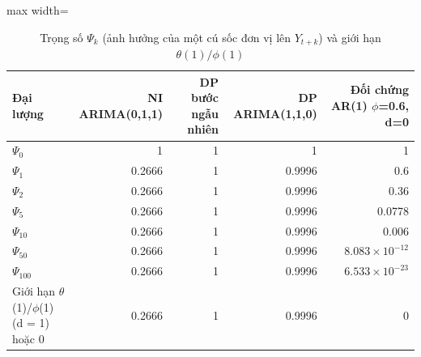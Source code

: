 \begin{table}[H]
\centering\footnotesize
\caption{Trọng số $\Psi_k$ (ảnh hưởng của một cú sốc đơn vị lên $Y_{t+k}$) và giới hạn $\theta(1)/\phi(1)$}\label{tab:tab_b12_06_psi_weights}
\begin{adjustbox}{max width=\linewidth}
\begin{tabular}{|l|r|r|r|r|}
\toprule
Đại lượng & NI ARIMA(0,1,1) & DP bước ngẫu nhiên & DP ARIMA(1,1,0) & Đối chứng AR(1) $\phi$=0.6, d=0 \\
\midrule
$\Psi_{0}$ & 1 & 1 & 1 & 1 \\
$\Psi_{1}$ & 0.2666 & 1 & 0.9996 & 0.6 \\
$\Psi_{2}$ & 0.2666 & 1 & 0.9996 & 0.36 \\
$\Psi_{5}$ & 0.2666 & 1 & 0.9996 & 0.0778 \\
$\Psi_{10}$ & 0.2666 & 1 & 0.9996 & 0.006 \\
$\Psi_{50}$ & 0.2666 & 1 & 0.9996 & $8.083\times10^{-12}$ \\
$\Psi_{100}$ & 0.2666 & 1 & 0.9996 & $6.533\times10^{-23}$ \\
Giới hạn $\theta$(1)/$\phi$(1) (d = 1) hoặc 0 & 0.2666 & 1 & 0.9996 & 0 \\
\bottomrule
\end{tabular}
\end{adjustbox}
\end{table}
